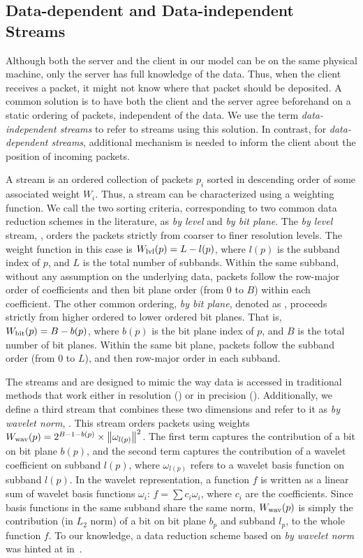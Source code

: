 \subsection{Data-dependent and Data-independent Streams} \label{sec:static-dynamic-streams}

Although both the server and the client in our model can be on the same physical machine, only the
server has full knowledge of the data. Thus, when the client receives a packet, it might not know
where that packet should be deposited. A common solution is to have both the client and the server
agree beforehand on a static ordering of packets, independent of the data. We use the term
\emph{data-independent streams} to refer to streams using this solution. In contrast, for
\emph{data-dependent streams}, additional mechanism is needed to inform the client about the
position of incoming packets.

A stream is an ordered collection of packets $p_i$ sorted in descending order of some associated
weight $W_i$. Thus, a stream can be characterized using a weighting function. We call the two
sorting criteria, corresponding to two common data reduction schemes in the literature, as \emph{by
level} and \emph{by bit plane}.  The \emph{by level} stream, \slvl, orders the packets strictly from
coarser to finer resolution levels. The weight function in this case is $\wlvl(p)=L-l(p)$, where
$l(p)$ is the subband index of $p$, and $L$ is the total number of subbands. Within the same
subband, without any assumption on the underlying data, packets follow the row-major order of
coefficients and then bit plane order (from 0 to $B$) within each coefficient. The other common
ordering, \emph{by bit plane}, denoted as \sbit, proceeds strictly from higher ordered to lower
ordered bit planes. That is, $\wbit(p)=B-b(p)$, where $b(p)$ is the bit plane index of $p$, and $B$
is the total number of bit planes. Within the same bit plane, packets follow the subband order (from
0 to $L$), and then row-major order in each subband.

The streams \slvl and \sbit are designed to mimic the way data is accessed in traditional methods
that work either in resolution (\slvl) or in precision (\sbit). Additionally, we define a third
stream that combines these two dimensions and refer to it as \emph{by wavelet norm}, \swav.  This
stream orders packets using weights $\wwav(p)=2^{B-1-b(p)}\times \norm{\omega_{l(p)}}^2$. The first
term captures the contribution of a bit on bit plane $b(p)$, and the second term captures the
contribution of a wavelet coefficient on subband $l(p)$, where $\omega_{l(p)}$ refers to a wavelet
basis function on subband $l(p)$. In the wavelet representation, a function $f$ is written as a
linear sum of wavelet basis functions $\omega_i$: $f=\sum{c_i\omega_i}$, where $c_i$ are the
coefficients. Since basis functions in the same subband share the same norm, $\wwav(p)$ is simply
the contribution (in $L_2$ norm) of a bit on bit plane $b_p$ and subband $l_p$, to the whole
function $f$. To our knowledge, a data reduction scheme based on \emph{by wavelet norm} was hinted
at in~\cite{weiss}.

